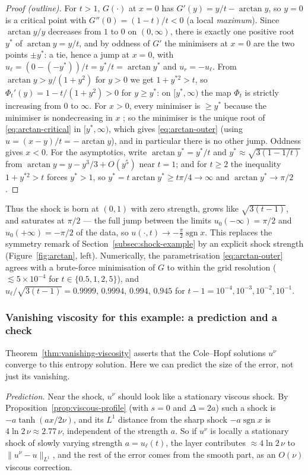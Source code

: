 \begin{proof}[Proof (outline)]
For $t>1$, $G(\cdot)$ at $x=0$ has $G'(y)=y/t-\arctan y$, so $y=0$ is a
critical point with $G''(0)=(1-t)/t<0$ (a local \emph{maximum}). Since
$\arctan y/y$ decreases from $1$ to $0$ on $(0,\infty)$, there is exactly one
positive root $y^*$ of $\arctan y=y/t$, and by oddness of $G'$ the
minimisers at $x=0$ are the two points $\pm y^*$: a tie, hence a jump at
$x=0$, with $u_\ell=(0-(-y^*))/t=y^*/t=\arctan y^*$ and $u_r=-u_\ell$.
From $\arctan y>y/(1+y^2)$ for $y>0$ we get $1+y^{*2}>t$, so
$\Phi_t'(y)=1-t/(1+y^2)>0$ for $y\ge y^*$: on $[y^*,\infty)$ the map
$\Phi_t$ is strictly increasing from $0$ to $\infty$. For $x>0$, every
minimiser is $\ge y^*$ because the minimiser is nondecreasing in $x$
\cite[\S3.4.2]{evans2010}; so the minimiser is the unique root of
\eqref{eq:arctan-critical} in $[y^*,\infty)$, which gives
\eqref{eq:arctan-outer} (using $u=(x-y)/t=-\arctan y$), and in particular
there is no other jump. Oddness gives $x<0$. For the asymptotics, write
$\arctan y^*=y^*/t$ and $y^*\approx\sqrt{3(1-1/t)}$ from
$\arctan y=y-y^3/3+O(y^5)$ near $t=1$; and for $t\ge2$ the inequality $1+y^{*2}>t$ forces $y^*>1$, so
$y^*=t\arctan y^*\ge t\pi/4\to\infty$ and $\arctan y^*\to\pi/2$.
\end{proof}

Thus the shock is born at $(0,1)$ with zero strength, grows like
$\sqrt{3(t-1)}$, and saturates at $\pi/2$ --- the full jump between the
limits $u_0(-\infty)=\pi/2$ and $u_0(+\infty)=-\pi/2$ of the data, so
$u(\cdot,t)\to-\tfrac\pi2\operatorname{sgn}x$. This replaces the symmetry
remark of Section~\ref{subsec:shock-example} by an explicit shock strength
(Figure~\ref{fig:arctan}, left). Numerically, the parametrisation
\eqref{eq:arctan-outer} agrees with a brute-force minimisation of $G$ to
within the grid resolution ($\lesssim5\times10^{-4}$ for
$t\in\{0.5,1,2,5\}$), and $u_\ell/\sqrt{3(t-1)}=0.9999,\,0.9994,\,0.994,\,
0.945$ for $t-1=10^{-4},10^{-3},10^{-2},10^{-1}$.

\subsubsection{Vanishing viscosity for this example: a prediction and a check}

Theorem~\ref{thm:vanishing-viscosity} asserts that the Cole--Hopf solutions
$u^\nu$ converge to this entropy solution. Here we can predict the size of
the error, not just its vanishing.

\emph{Prediction.} Near the shock, $u^\nu$ should look like a stationary
viscous shock. By Proposition~\ref{prop:viscous-profile} (with $s=0$ and
$\Delta=2a$) such a shock is $-a\tanh(ax/2\nu)$, and its $L^1$ distance from the
sharp shock $-a\operatorname{sgn}x$ is $4\ln2\,\nu\approx2.77\,\nu$,
independent of the strength $a$. So if $u^\nu$ is locally a stationary shock of
slowly varying strength $a=u_\ell(t)$, the layer contributes
$\approx4\ln2\,\nu$ to $\|u^\nu-u\|_{L^1}$, and the rest of the error comes
from the smooth part, as an $O(\nu)$ viscous correction.

